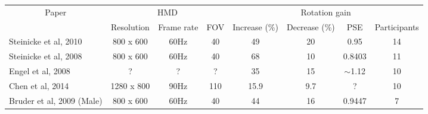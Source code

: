 \begin{table}[]
\centering
\begin{tabular}{|l|ccc|cccc|}
\hline
\multicolumn{1}{|c|}{\multirow{2}{*}{Paper}} & \multicolumn{3}{c|}{HMD}                                                                                                                                                    & \multicolumn{4}{c|}{Rotation gain}                        \\ \cline{2-8} 
\multicolumn{1}{|c|}{}                       & Resolution                                                       & Frame rate                                          & FOV                                                & Increase (\%) & Decrease (\%) & PSE        & Participants \\ \hline
Steinicke et al, 2010\cite{steinicke2010estimation}                              & 800 x 600                                                        & 60Hz                                                & 40                                                 & 49            & 20            & 0.95       & 14           \\ \hline
Steinicke et al, 2008\cite{steinicke2008analyses}                              & 800 x 600                                                        & 60Hz                                                & 40                                                 & 68            & 10            & 0.8403     & 11           \\ \hline
Engel et al, 2008\cite{engel2008psychophysically}                                  & ?                                                                & ?                                                   & ?                                                  & 35            & 15            & $\sim$1.12 & 10           \\ \hline
Chen et al, 2014\cite{chen2014influence}                                   & 1280 x 800                                                       & 90Hz                                                & 110                                                & 15.9          & 9.7           & ?          & 10           \\ \hline
Bruder et al, 2009\cite{bruder2009impact} (Male)                          & 800 x 600                                                        & 60Hz                                                & 40                                                 & 44            & 16            & 0.9447     & 7            \\ \hline

\end{tabular}
\end{table}
